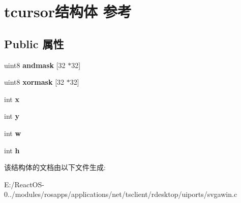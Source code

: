 \hypertarget{structtcursor}{}\section{tcursor结构体 参考}
\label{structtcursor}
\subsection*{Public 属性}
\begin{DoxyCompactItemize}
\item 
\mbox{\label{structtcursor_a19a9f99405eee94892ea5d5a3b2781a2}} 
uint8 {\bfseries andmask} \mbox{[}32 $\ast$32\mbox{]}
\item 
\mbox{\label{structtcursor_a940aed82e78dc6637ba3584433dbfb64}} 
uint8 {\bfseries xormask} \mbox{[}32 $\ast$32\mbox{]}
\item 
\mbox{\label{structtcursor_a13da661db56c520267a9e5fcf796e40a}} 
int {\bfseries x}
\item 
\mbox{\label{structtcursor_a8ada490ab8f9a6675d0c5cc8d430eae9}} 
int {\bfseries y}
\item 
\mbox{\label{structtcursor_ada5ae9caf778dedbdb82d9d38e32182e}} 
int {\bfseries w}
\item 
\mbox{\label{structtcursor_a3ada010802bcdfe1730927aa5da5eefc}} 
int {\bfseries h}
\end{DoxyCompactItemize}


该结构体的文档由以下文件生成\+:\begin{DoxyCompactItemize}
\item 
E\+:/\+React\+O\+S-\/0../modules/rosapps/applications/net/tsclient/rdesktop/uiports/svgawin.\+c\end{DoxyCompactItemize}
